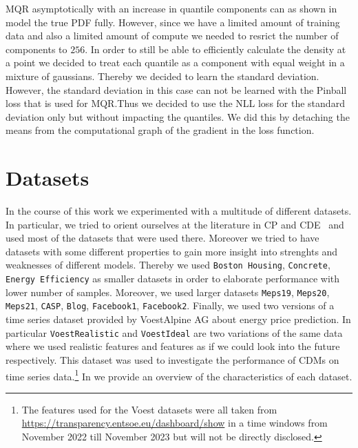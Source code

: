 MQR asymptotically with an increase in quantile components can as shown in  model the true PDF fully. However, since we have a limited amount of training data and also a limited amount of compute we needed to resrict the number of components to $256$. In order to still be able to efficiently calculate the density at a point we decided to treat each quantile as a component with equal weight in a mixture of gaussians. Thereby we decided to learn the standard deviation. However, the standard deviation in this case can not be learned with the Pinball loss that is used for MQR.\@ Thus we decided to use the NLL loss for the standard deviation only but without impacting the quantiles. We did this by detaching the means from the computational graph of the gradient in the loss function.

\section{Datasets}\label{sec:datasets}

In the course of this work we experimented with a multitude of different datasets. In particular, we tried to orient ourselves at the literature in CP and CDE~\cite{rothfuss2019noise,sesia2021conformal} and used most of the datasets that were used there. Moreover we tried to have datasets with some different properties to gain more insight into strenghts and weaknesses of different models. Thereby we used \texttt{Boston Housing}, \texttt{Concrete}, \texttt{Energy Efficiency} as smaller datasets in order to elaborate performance with lower number of samples. Moreover, we used larger datasets \texttt{Meps19}, \texttt{Meps20}, \texttt{Meps21}, \texttt{CASP}, \texttt{Blog}, \texttt{Facebook1}, \texttt{Facebook2}. Finally, we used two versions of a time series dataset provided by VoestAlpine AG about energy price prediction. In particular \texttt{VoestRealistic} and \texttt{VoestIdeal} are two variations of the same data where we used realistic features and features as if we could look into the future respectively. This dataset was used to investigate the performance of CDMs on time series data.\footnote{The features used for the Voest datasets were all taken from \url{https://transparency.entsoe.eu/dashboard/show} in a time windows from November 2022 till November 2023 but will not be directly disclosed.} In  we provide an overview of the characteristics of each dataset.

